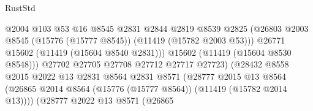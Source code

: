 \begin{lexlean}{RustStd}
\begin{coremodule}
                                              @2004
                                              @103
                                              @53
                                              @16
                                              @8545
                                              @2831
                                              @2844
                                              @2819
                                              @8539
                                              @2825
                                              (@26803
                                                @2003
                                                @8545
                                                (@15776 (@15777 @8545))
                                                (@11419 (@15782 @2003 @53)))
                                              @26771
                                              @15602
                                              (@11419 (@15604 @8540 @2831)))
                                            @15602
                                            (@11419 (@15604 @8530 @8548)))
                                          @27702
                                          @27705
                                          @27708
                                          @27712
                                          @27717
                                          @27723)
                                        (@28432
                                          @8558
                                          @2015
                                          @2022
                                          @13
                                          @2831
                                          @8564
                                          @2831
                                          @8571
                                          (@28777
                                            @2015
                                            @13
                                            @8564
                                            (@26865
                                              @2014
                                              @8564
                                              (@15776 (@15777 @8564))
                                              (@11419 (@15782 @2014 @13))))
                                          (@28777
                                            @2022
                                            @13
                                            @8571
                                            (@26865

\end{coremodule}
\end{lexlean}
